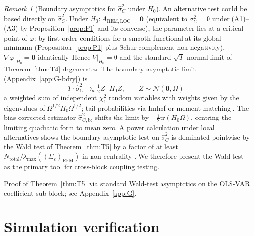 \documentclass[11pt,letterpaper]{article}
\theoremstyle{remark}
\newtheorem{remark}{Remark}
\newcommand{\REM}{\mathrm{REM}}
\newcommand{\LOC}{\mathrm{LOC}}
\newcommand{\Ntot}{N_{\mathrm{total}}}
\newcommand{\trace}{\mathrm{tr}}
\begin{document}
\begin{remark}[Boundary asymptotics for $\widehat{\sigma}^2_C$ under $H_0$]\label{rem:bdry}
An alternative test could be based directly on $\widehat{\sigma}^2_C$. Under $H_0: A_{\REM, \LOC} = \mathbf{0}$ (equivalent to $\sigma^2_C = 0$ under (A1)--(A3) by Proposition~\ref{prop:P1} and its converse), the parameter lies at a critical point of $\varphi$: by first-order conditions for a smooth functional at its global minimum (Proposition~\ref{prop:P1} plus Schur-complement non-negativity), $\nabla \varphi |_{H_0} = \mathbf{0}$ identically. Hence $V|_{H_0} = 0$ and the standard $\sqrt{T}$-normal limit of Theorem~\ref{thm:T4} degenerates. The boundary-asymptotic limit (Appendix~\ref{app:G-bdry}) is
\[
T \cdot \widehat{\sigma}^2_C \to_d \tfrac{1}{2} Z^\top H_0 Z, \qquad Z \sim \mathcal{N}(\mathbf{0}, \Omega),
\]
a weighted sum of independent $\chi^2_1$ random variables with weights given by the eigenvalues of $\Omega^{1/2} H_0 \Omega^{1/2}$; tail probabilities via Imhof \cite{Imhof1961} or moment-matching \cite{Davies1980}. The bias-corrected estimator $\widehat{\sigma}^2_{C, \mathrm{bc}}$ shifts the limit by $-\tfrac{1}{2}\trace(H_0 \Omega)$, centring the limiting quadratic form to mean zero. A power calculation under local alternatives shows the boundary-asymptotic test on $\widehat{\sigma}^2_C$ is dominated pointwise by the Wald test of Theorem~\ref{thm:T5} by a factor of at least $\Ntot / \lambda_{\max}((\Sigma_\varepsilon)_\REM)$ in non-centrality \cite{Andrews2001,SelfLiang1987}. We therefore present the Wald test as the primary tool for cross-block coupling testing.
\end{remark}

Proof of Theorem~\ref{thm:T5} via standard Wald-test asymptotics on the OLS-VAR coefficient sub-block; see Appendix~\ref{app:G}.

\section{Simulation verification}\label{sec:sim}
\end{document}
